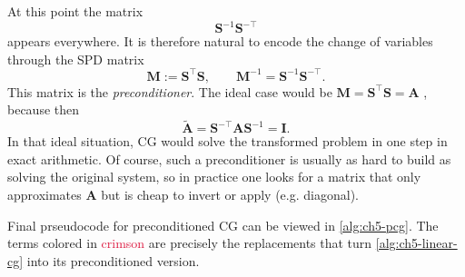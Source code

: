 At this point the matrix
\[
  \mathbf{S}^{-1}\mathbf{S}^{-\top}
\]
appears everywhere. It is therefore natural to encode the change of variables
through the SPD matrix
\[
  \mathbf{M}:=\mathbf{S}^{\top}\mathbf{S},
  \qquad
  \mathbf{M}^{-1}=\mathbf{S}^{-1}\mathbf{S}^{-\top}.
\]
This matrix is the \emph{preconditioner}. 
The ideal case would be $\mathbf{M}= \mathbf{S}^{\top}\mathbf{S}=\mathbf{A}$
, because then
\[
  \tilde{\mathbf{A}}
  =\mathbf{S}^{-\top}\mathbf{A}\mathbf{S}^{-1}
  =\mathbf{I}.
\]
In that ideal situation, CG would solve the transformed problem in one step in
exact arithmetic. Of course, such a preconditioner is usually as hard to build
as solving the original system, so in practice one looks for a matrix that only
approximates $\mathbf{A}$ but is cheap to invert or apply (e.g. diagonal).

Final prseudocode for preconditioned CG can be viewed in \cref{alg:ch5-pcg}. The terms
colored in \textcolor{crimson}{crimson} are precisely the replacements that
turn \cref{alg:ch5-linear-cg} into its preconditioned version.

